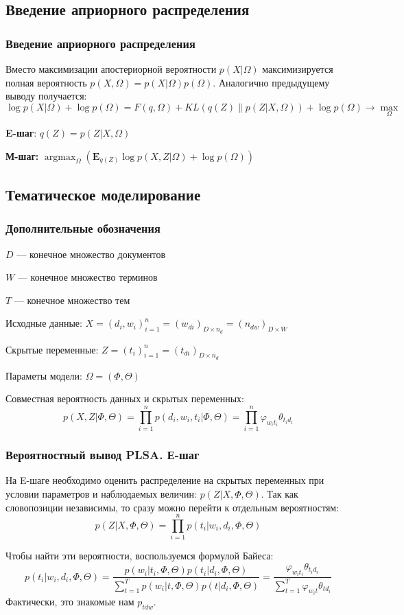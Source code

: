 \documentclass[utf8]{beamer}
\DeclareMathOperator{\argmax}{argmax}
\renewcommand{\phi}{\varphi}
\begin{document}
	\subsection{Введение априорного распределения}
	\begin{frame}	
	\frametitle{Введение априорного распределения}
	Вместо максимизации апостериорной вероятности $p(X|\Omega)$ максимизируется полная  вероятность $p(X, \Omega)= p(X|\Omega) p(\Omega)$. Аналогично предыдущему выводу получается:
\[
\log p(X|\Omega) + \log p(\Omega) = F(q, \Omega) + KL(q(Z)\|p(Z|X,\Omega)) + \log p(\Omega) \to \max\limits_{\Omega}
\]

\textbf{E-шаг}: $q(Z) = p(Z|X, \Omega)$

\medskip

\textbf{М-шаг:} $\argmax_{\Omega} \left( \mathbf{E}_{q(Z)} \log p(X, Z|\Omega) + \log p(\Omega)\right)$ 
	\end{frame}


	\subsection{Тематическое моделирование}

 	\begin{frame}
		\frametitle{Дополнительные обозначения}  
$D$ --- конечное множество документов
\smallskip

$W$  --- конечное множество терминов
\smallskip

$T$ --- конечное множество тем
\smallskip

Исходные данные:
$X = (d_i ,w_i)_{i=1}^n = (w_{di})_{D \times n_d} = (n_{dw})_{D \times W}$
\smallskip

Скрытые переменные:
$Z = (t_i)_{i=1}^n = (t_{di})_{D \times n_d}$
\smallskip

Параметы модели:
$\Omega = (\Phi, \Theta)$
\smallskip

Совместная вероятность данных и скрытых переменных:
\[
p(X, Z|\Phi, \Theta) =\prod\limits_{i=1}^{n} p(d_{i}, w_{i}, t_{i}|\Phi, \Theta) =\prod\limits_{i=1}^{n} \phi_{w_{i}t_{i}}\theta_{t_{i}d_{i}}
\]
	\end{frame}

	
 	\begin{frame}
		\frametitle{Вероятностный вывод PLSA. Е-шаг}   
На E-шаге необходимо оценить распределение на скрытых переменных при условии параметров и  наблюдаемых величин: $p(Z|X,\Phi,\Theta)$. Так как словопозиции независимы, то сразу можно перейти к отдельным вероятностям:
\[
p(Z|X,\Phi, \Theta) = \prod\limits_{i=1}^{n} p(t_i| w_i, d_i, \Phi, \Theta)
\]

Чтобы найти эти вероятности, воспользуемся формулой Байеса:
\[
p(t_{i}|w_{i}, d_{i}, \Phi, \Theta) = \frac{p(w_{i}|t_{i}, \Phi, \Theta)p(t_{i}|d_{i}, \Phi,\Theta)}{\sum_{t=1}^T p(w_{i}|t, \Phi, \Theta)p(t|d_{i}, \Phi,\Theta)}
= \frac{\phi_{w_{i} t_{i}} \theta_{t_{i} d_i}}{\sum_{t=1}^T \phi_{w_{i}t} \theta_{td_i}}
\]
Фактически, это знакомые нам $p_{tdw}$.
	\end{frame}
	
\end{document}
